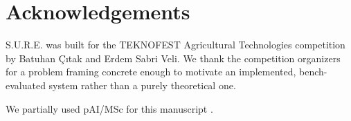 \section*{Acknowledgements}
\label{sec:acknowledgements}

S.U.R.E. was built for the TEKNOFEST Agricultural Technologies competition by Batuhan Çıtak and
Erdem Sabri Veli. We thank the competition organizers for a problem framing concrete enough to
motivate an implemented, bench-evaluated system rather than a purely theoretical one.

We partially used pAI/MSc for this manuscript \citep{pAIMSc_2026}.
